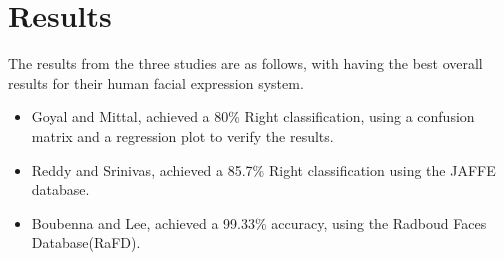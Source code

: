 \section{Results}
The results from the three studies are as follows, with \cite{3} having the best overall results for their human facial expression system.
\begin{itemize}
\item Goyal and Mittal, achieved a 80\% Right classification, using a confusion matrix and a regression plot to verify the results\cite{1}.
\item Reddy and Srinivas, achieved a 85.7\% Right classification using the JAFFE database\cite{2}.
\item Boubenna and Lee, achieved a 99.33\% accuracy, using the Radboud Faces Database(RaFD)\cite{3}.
\end{itemize}


